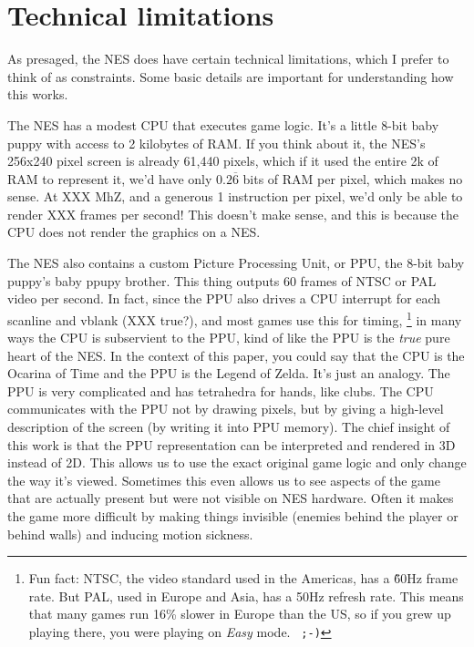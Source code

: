\documentclass[twocolumn]{article}
\begin{document}
\section{Technical limitations}

As presaged, the NES does have certain technical limitations, which I
prefer to think of as constraints. Some basic details are important
for understanding how this works.

The NES has a modest CPU that executes game logic. It's a little 8-bit
baby puppy with access to 2 kilobytes of RAM. If you think about it,
the NES's 256x240 pixel screen is already 61,440 pixels, which if it
used the entire 2k of RAM to represent it, we'd have only
$0.2\overline{6}$ bits of RAM per pixel, which makes no sense. At XXX
MhZ, and a generous 1 instruction per pixel, we'd only be able to render
XXX frames per second! This doesn't make sense, and this is because
the CPU does not render the graphics on a NES.

The NES also contains a custom Picture Processing Unit, or PPU, the
8-bit baby puppy's baby ppupy brother. This thing outputs 60 frames of
NTSC or PAL video per second. In fact, since the PPU also drives a CPU
interrupt for each scanline and vblank (XXX true?), and most games use
this for timing,%
%
\footnote{Fun fact: NTSC, the video standard used in the Americas, has
  a \~60Hz frame rate. But PAL, used in Europe and Asia, has a 50Hz
  refresh rate. This means that many games run 16\% slower in Europe
  than the US, so if you grew up playing there, you were playing on
  {\em Easy} mode. {\tt\ ;-)}}
%
in many ways the CPU is subservient to the PPU, kind of like the PPU
is the {\it true} pure heart of the NES. In the context of this paper, you
could say that the CPU is the Ocarina of Time and the PPU is the
Legend of Zelda. It's just an analogy. The PPU is very complicated and
has tetrahedra for hands, like clubs. The CPU communicates with
the PPU not by drawing pixels, but by giving a high-level description
of the screen (by writing it into PPU memory). The chief insight of
this work is that the PPU representation can be interpreted and
rendered in 3D instead of 2D. This allows us to use the exact original
game logic and only change the way it's viewed. Sometimes this even
allows us to see aspects of the game that are actually present but
were not visible on NES hardware. Often it makes the game more
difficult by making things invisible (enemies behind the player or
behind walls) and inducing motion sickness.
\end{document}
